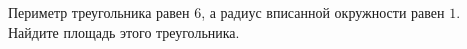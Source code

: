 \begin{ex}
	\begin{condition}
		Периметр треугольника равен \( 6 \), а радиус вписанной окружности равен \( 1 \). Найдите площадь этого треугольника.
	\end{condition}
\end{ex}